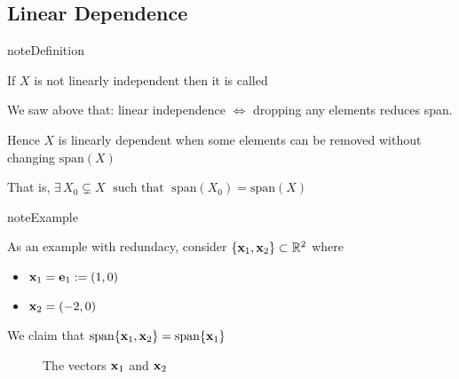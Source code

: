 \documentclass[letterpaper,10pt,english]{jupyterBook}
\begin{document}
\subsection{Linear Dependence}
\label{\detokenize{05.linear_algebra:linear-dependence}}
\begin{sphinxadmonition}{note}{Definition}

\sphinxAtStartPar
If \(X\) is not linearly independent then it is called 
\end{sphinxadmonition}

\sphinxAtStartPar
We saw above that: linear independence \(\iff\) dropping any elements reduces span.

\sphinxAtStartPar
Hence \(X\) is linearly dependent when some
elements can be removed without changing \(\mathrm{span}(X)\)

\sphinxAtStartPar
That is,
\(\exists \, X_0 \subsetneq X \; \text{ such that } \; \mathrm{span}(X_0) = \mathrm{span}(X)\)

\begin{sphinxadmonition}{note}{Example}

\sphinxAtStartPar
As an example with redundacy, consider \(\{{\bf x}_1, {\bf x}_2\} \subset \mathbb{R}^2\) where
\begin{itemize}
\item {} 
\sphinxAtStartPar
\({\bf x}_1 = {\bf e}_1 := (1, 0)\)

\item {} 
\sphinxAtStartPar
\({\bf x}_2 = (-2, 0)\)

\end{itemize}

\sphinxAtStartPar
We claim that \(\mathrm{span} \{{\bf x}_1, {\bf x}_2\} = \mathrm{span}\{{\bf x}_1\}\)
\end{sphinxadmonition}

\begin{figure}[htbp]
\centering
\capstart

\noindent{}
\caption{The vectors \({\bf x}_1\) and \({\bf x}_2\)}\label{\detokenize{05.linear_algebra:f-vec-noncanon}}\end{figure}
\end{document}
